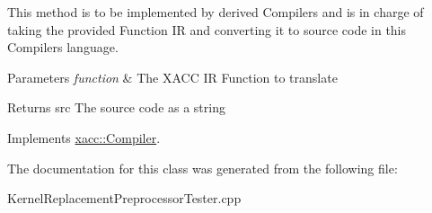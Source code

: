 This method is to be implemented by derived Compilers and is in charge of taking the provided Function IR and converting it to source code in this Compiler\textquotesingle{}s language.


\begin{DoxyParams}{Parameters}
{\em function} & The X\+A\+CC IR Function to translate \\
\hline
\end{DoxyParams}
\begin{DoxyReturn}{Returns}
src The source code as a string 
\end{DoxyReturn}


Implements \hyperlink{a01100_aeedbe58a33fed29e4d7694ae743e25e7}{xacc\+::\+Compiler}.



The documentation for this class was generated from the following file\+:\begin{DoxyCompactItemize}
\item 
Kernel\+Replacement\+Preprocessor\+Tester.\+cpp\end{DoxyCompactItemize}

